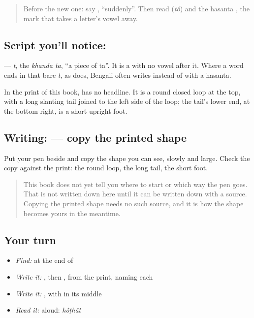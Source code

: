 \label{lesson:BN-W267-letter-khanda-ta}



\begin{quote}
Before the new one: say \textbf{}, \textquotedblleft{}suddenly\textquotedblright{}. Then read \textbf{} (\emph{tô}) and the hasanta \textbf{}, the mark that takes a letter's vowel away.
\end{quote}

\subsection*{Script you'll notice: }
\textbf{} — \emph{t}, the \emph{khanda ta}, \textquotedblleft{}a piece of ta\textquotedblright{}. It is a \textbf{} with no vowel after it. Where a word ends in that bare \emph{t}, as \textbf{} does, Bengali often writes \textbf{} instead of \textbf{} with a hasanta.

In the print of this book, \textbf{} has no headline. It is a round closed loop at the top, with a long slanting tail joined to the left side of the loop; the tail's lower end, at the bottom right, is a short upright foot.

\subsection*{Writing:  — copy the printed shape}
Put your pen beside \textbf{} and copy the shape you can see, slowly and large. Check the copy against the print: the round loop, the long tail, the short foot.

\begin{quote}
This book does not yet tell you where to start  or which way the pen goes. That is not written down here until it can be written down with a source. Copying the printed shape needs no such source, and it is how the shape becomes yours in the meantime.
\end{quote}

\subsection*{Your turn}
\begin{itemize}
\raggedright
  \item \emph{Find:}  at the end of \textbf{}
  \item \emph{Write it:} , then , from the print, naming each
  \item \emph{Write it:} \textbf{}, with  in its middle
  \item \emph{Read it:} \textbf{} aloud: \emph{hôṭhāt}
\end{itemize}

